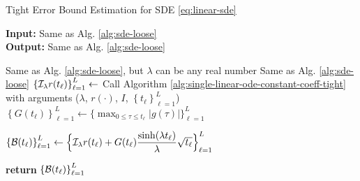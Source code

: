     \begin{algorithm}
        \caption{Tight Error Bound Estimation for SDE \eqref{eq:linear-sde}}\label{alg:sde-tight}
        \textbf{Input:} Same as Alg. \ref{alg:sde-loose}\\
        \textbf{Output:} Same as Alg. \ref{alg:sde-loose}\\
        \begin{algorithmic}
            \Require Same as Alg. \ref{alg:sde-loose}, but $\lambda$ can be any real number
            \Ensure Same as Alg. \ref{alg:sde-loose}
            \State $\left\{\mathcal{I}_{\lambda} r (t_\ell)\right\}_{\ell=1}^{L} \gets$ Call Algorithm \ref{alg:single-linear-ode-constant-coeff-tight} with arguments ($\lambda$, $r(\cdot)$, $I$, $\left\{t_\ell\right\}_{\ell=1}^{L}$)
            \State $\displaystyle \left\{G(t_\ell)\right\}_{\ell=1}^{L} \gets \Big\{\max_{0 \leq \tau \leq t_\ell} |g(\tau)|\Big\}_{\ell=1}^{L}$ 

            \State $\left\{\mathcal{B}(t_\ell)\right\}_{\ell=1}^{L} \gets \Big\{\mathcal{I}_{\lambda} r (t_\ell) + G(t_\ell) \dfrac{\sinh(\lambda t_\ell)}{\lambda} \sqrt{t_\ell}\Big\}_{\ell=1}^{L}$ 

            \State \textbf{return} $\left\{\mathcal{B}(t_\ell)\right\}_{\ell=1}^{L}$
        \end{algorithmic}
    \end{algorithm}